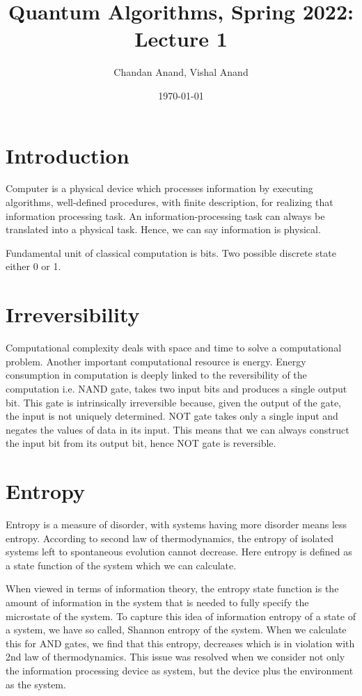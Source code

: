 \documentclass[11.5pt, paper=a4]{article}
\title{Quantum Algorithms, Spring 2022: Lecture 1}
\author{Chandan Anand, Vishal Anand}
\date{\today}
\theoremstyle{definition}
\numberwithin{theorem}{section}
\begin{document}
\maketitle

\section{Introduction}

Computer is a physical device which processes information by executing algorithms, well-defined procedures, with finite description, for realizing that information processing task. An information-processing task can always be translated into a physical task. Hence, we can say information is physical.

Fundamental unit of classical computation is bits. Two possible discrete state either 0 or 1.


\section{Irreversibility}
Computational complexity deals with space and time to solve a computational problem. Another important computational resource is energy. Energy consumption in computation is deeply linked to the reversibility of the computation i.e. NAND gate, takes two input bits and produces a single output bit. This gate is intrinsically irreversible because, given the output of the gate, the input is not uniquely determined.
NOT gate takes only a single input and negates the values of data in its input. This means that we can always construct the input bit from its output bit, hence NOT gate is reversible.\\

\section{Entropy}
Entropy is a measure of disorder, with systems having more disorder means less entropy. According to second law of thermodynamics, the entropy of isolated systems left to spontaneous evolution cannot decrease. Here entropy is defined as a state function of the system which we can calculate.

When viewed in terms of information theory, the entropy state function is the amount of information in the system that is needed to fully specify the microstate of the system. To capture this idea of information entropy of a state of a system, we have so called, Shannon entropy of the system. When we calculate this for AND gates, we find that this entropy, decreases which is in violation with 2nd law of thermodynamics.
This issue was resolved when we consider not only the information processing device as system, but the device plus the environment as the system.
\end{document}
